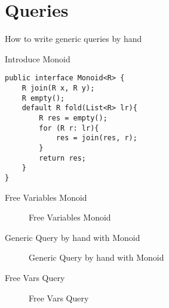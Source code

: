 \section{Queries}\label{sec:queries}

How to write generic queries by hand

Introduce Monoid
\begin{lstlisting}[numbers=none]
public interface Monoid<R> {
    R join(R x, R y);
    R empty();
    default R fold(List<R> lr){
    	R res = empty();
    	for (R r: lr){
    		res = join(res, r);
    	}
    	return res;
    }
}
\end{lstlisting}

Free Variables Monoid
\begin{figure}[tb]
\vspace{-.1in}
\caption{Free Variables Monoid\label{sec:queries}}
\end{figure}


Generic Query by hand with Monoid
\begin{figure}[tb]
\vspace{-.1in}
\caption{Generic Query by hand with Monoid\label{sec:queries}}
\end{figure}

Free Vars Query
\begin{figure}[tb]
\vspace{-.1in}
\caption{Free Vars Query\label{sec:queries}}
\end{figure}
